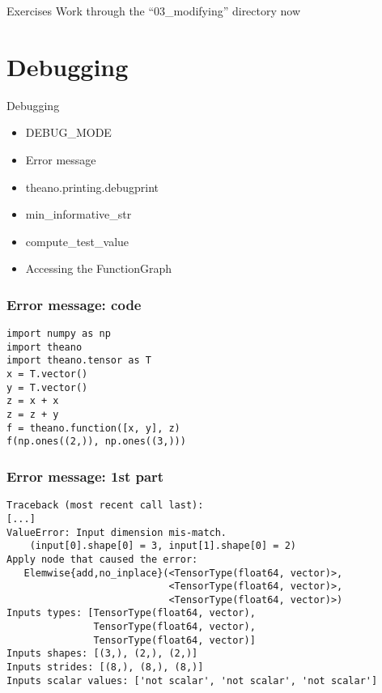 \documentclass[utf8x,xcolor=pdftex,dvipsnames,table]{beamer}
\begin{document}
\begin{frame}{Exercises}
Work through the ``03\_modifying'' directory now
\end{frame}

\section{Debugging}
\begin{frame}{Debugging}
  \begin{itemize}
  \item DEBUG\_MODE
  \item Error message
  \item theano.printing.debugprint
  \item min\_informative\_str
  \item compute\_test\_value
  \item Accessing the FunctionGraph
  \end{itemize}
\end{frame}

\begin{frame}[fragile]
  \frametitle{Error message: code}
\begin{lstlisting}
import numpy as np
import theano
import theano.tensor as T
x = T.vector()
y = T.vector()
z = x + x
z = z + y
f = theano.function([x, y], z)
f(np.ones((2,)), np.ones((3,)))
\end{lstlisting}
\end{frame}

\begin{frame}[fragile]
  \frametitle{Error message: 1st part}

\begin{lstlisting}
Traceback (most recent call last):
[...]
ValueError: Input dimension mis-match.
    (input[0].shape[0] = 3, input[1].shape[0] = 2)
Apply node that caused the error:
   Elemwise{add,no_inplace}(<TensorType(float64, vector)>,
                            <TensorType(float64, vector)>,
                            <TensorType(float64, vector)>)
Inputs types: [TensorType(float64, vector),
               TensorType(float64, vector),
               TensorType(float64, vector)]
Inputs shapes: [(3,), (2,), (2,)]
Inputs strides: [(8,), (8,), (8,)]
Inputs scalar values: ['not scalar', 'not scalar', 'not scalar']
\end{lstlisting}
\end{frame}
\end{document}
